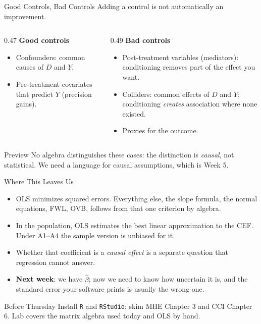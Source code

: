 \documentclass[aspectratio=169,11pt,xcolor=dvipsnames]{beamer}
\begin{document}
\begin{frame}{Good Controls, Bad Controls}
Adding a control is not automatically an improvement.
\vskip2pt
\begin{columns}[T]
\begin{column}{0.47\textwidth}
\textbf{Good controls}
\begin{itemize}
  \item Confounders: common causes of $D$ and $Y$.
  \item Pre-treatment covariates that predict $Y$ (precision gains).
\end{itemize}
\end{column}
\begin{column}{0.49\textwidth}
\textbf{Bad controls}
\begin{itemize}
  \item \alert{Post-treatment} variables (mediators): conditioning removes part of
        the effect you want.
  \item \alert{Colliders}: common effects of $D$ and $Y$; conditioning
        \emph{creates} association where none existed.
  \item Proxies for the outcome.
\end{itemize}
\end{column}
\end{columns}
\vskip4pt
\begin{alertblock}{Preview}
No algebra distinguishes these cases: the distinction is \emph{causal}, not
statistical. We need a language for causal assumptions, which is Week 5.
\end{alertblock}
\end{frame}

\begin{frame}{Where This Leaves Us}
\begin{itemize}\itemsep5pt
  \item OLS minimizes squared errors. Everything else, the slope formula, the
        normal equations, FWL, OVB, follows from that one criterion by algebra.
  \item In the population, OLS estimates the best linear approximation to the CEF.
        Under A1--A4 the sample version is unbiased for it.
  \item Whether that coefficient is a \emph{causal effect} is a separate question
        that regression cannot answer.
  \item \textbf{Next week}: we have $\hat\beta$; now we need to know how uncertain
        it is, and the standard error your software prints is usually the wrong
        one.
\end{itemize}
\vskip6pt
\begin{block}{Before Thursday}
Install \texttt{R} and \texttt{RStudio}; skim MHE Chapter 3 and CCI Chapter 6.
Lab covers the matrix algebra used today and OLS by hand.
\end{block}
\end{frame}
\end{document}
